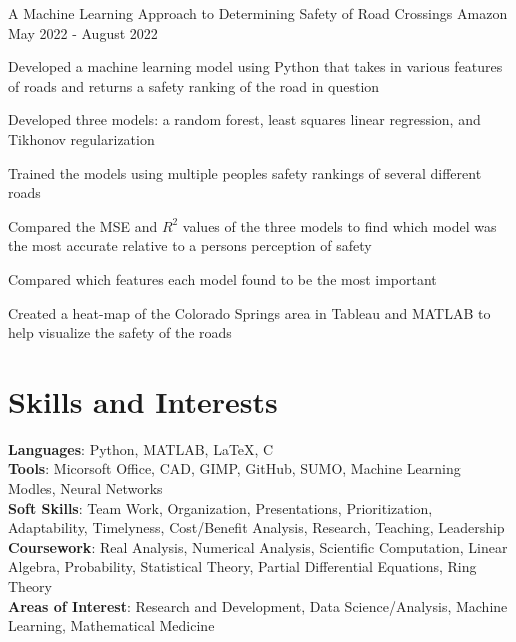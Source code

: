     \resumeProject
      {A Machine Learning Approach to Determining Safety of Road Crossings}
      {Amazon}
      {May 2022 - August 2022}

      \resumeItemListStart
        \item {Developed a machine learning model using Python that takes in various features of roads and returns a 
        safety ranking of the road in question}
        \item {Developed three models: a random forest, least squares linear regression, and Tikhonov regularization}
        \item {Trained the models using multiple peoples safety rankings of several different roads}
        \item {Compared the MSE and $R^2$ values of the three models to find which model was the most accurate relative 
        to a persons perception of safety}
        \item {Compared which features each model found to be the most important}
        \item {Created a heat-map of the Colorado Springs area in Tableau and MATLAB to help visualize the safety of the 
        roads}
    \resumeItemListEnd
      
  \resumeSubHeadingListEnd
\vspace{-5.0mm}



\section{\textbf{Skills and Interests}}
 \begin{itemize}[leftmargin=0.05in, label={}]
    \small{\item{
     \textbf{Languages}{: Python, MATLAB, LaTeX, C} \\
     \textbf{Tools}{: Micorsoft Office, CAD, GIMP, GitHub, SUMO, Machine Learning Modles, Neural Networks} \\
     \textbf{Soft Skills}{: Team Work, Organization, Presentations, Prioritization, Adaptability, Timelyness,
      Cost/Benefit Analysis, Research, Teaching, Leadership} \\
     \textbf{Coursework}{: Real Analysis, Numerical Analysis, Scientific Computation, Linear Algebra,
      Probability, Statistical Theory, Partial Differential Equations, Ring Theory} \\
     \textbf{Areas of Interest}{: Research and Development, Data Science/Analysis, Machine Learning, Mathematical Medicine} \\
    }}
 \end{itemize}
\vspace{-5.0mm}



